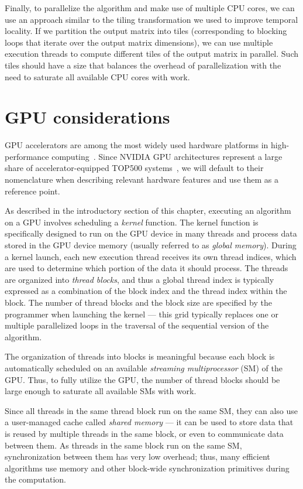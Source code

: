Finally, to parallelize the algorithm and make use of multiple CPU cores, we can use an approach similar to the tiling transformation we used to improve temporal locality. If we partition the output matrix into tiles (corresponding to blocking loops that iterate over the output matrix dimensions), we can use multiple execution threads to compute different tiles of the output matrix in parallel.
Such tiles should have a size that balances the overhead of parallelization with the need to saturate all available CPU cores with work.


\section{GPU considerations}\label{sec:gpu-considerations}

GPU accelerators are among the most widely used hardware platforms in high-performance computing~\cite{top500}. Since NVIDIA GPU architectures represent a large share of accelerator-equipped TOP500 systems~\cite{top500}, we will default to their nomenclature when describing relevant hardware features and use them as a reference point.

As described in the introductory section of this chapter, executing an algorithm on a GPU involves scheduling a \emph{kernel} function. The kernel function is specifically designed to run on the GPU device in many threads and process data stored in the GPU device memory (usually referred to as \emph{global memory}). During a kernel launch, each new execution thread receives its own thread indices, which are used to determine which portion of the data it should process. The threads are organized into \emph{thread blocks}, and thus a global thread index is typically expressed as a combination of the block index and the thread index within the block. The number of thread blocks and the block size are specified by the programmer when launching the kernel --- this grid typically replaces one or multiple parallelized loops in the traversal of the sequential version of the algorithm.

The organization of threads into blocks is meaningful because each block is automatically scheduled on an available \emph{streaming multiprocessor} (SM) of the GPU\@. Thus, to fully utilize the GPU, the number of thread blocks should be large enough to saturate all available SMs with work.

Since all threads in the same thread block run on the same SM, they can also use a user-managed cache called \emph{shared memory} --- it can be used to store data that is reused by multiple threads in the same block, or even to communicate data between them. As threads in the same block run on the same SM, synchronization between them has very low overhead; thus, many efficient algorithms use memory and other block-wide synchronization primitives during the computation.

